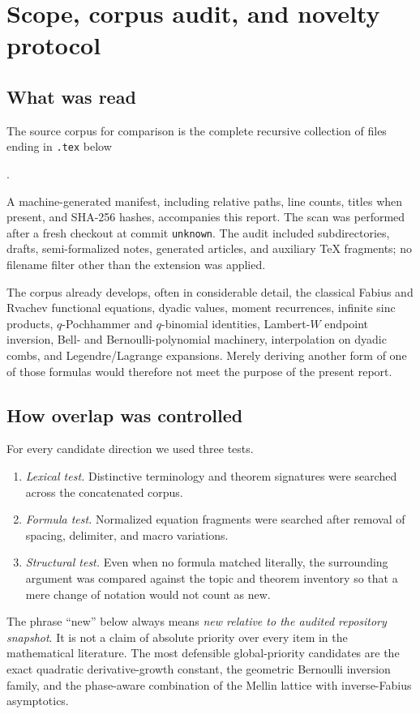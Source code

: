 \documentclass[11pt,oneside]{article}
\theoremstyle{definition}
\theoremstyle{remark}
\newcommand{\RepoCommit}{\texttt{unknown}}
\begin{document}
\tableofcontents
\clearpage

\section{Scope, corpus audit, and novelty protocol}

\subsection{What was read}

The source corpus for comparison is the complete recursive collection of files ending
in \texttt{.tex} below
\begin{center}
.
\end{center}
A machine-generated manifest, including relative paths, line counts, titles when
present, and SHA-256 hashes, accompanies this report.  The scan was performed after a
fresh checkout at commit \RepoCommit.  The audit included subdirectories, drafts,
semi-formalized notes, generated articles, and auxiliary TeX fragments; no filename
filter other than the extension was applied.

The corpus already develops, often in considerable detail, the classical Fabius and
Rvachev functional equations, dyadic values, moment recurrences, infinite sinc
products, $q$-Pochhammer and $q$-binomial identities, Lambert-$W$ endpoint inversion,
Bell- and Bernoulli-polynomial machinery, interpolation on dyadic combs, and
Legendre/Lagrange expansions.  Merely deriving another form of one of those formulas
would therefore not meet the purpose of the present report.

\subsection{How overlap was controlled}

For every candidate direction we used three tests.
\begin{enumerate}[label=(\roman*)]
\item \emph{Lexical test.}  Distinctive terminology and theorem signatures were
searched across the concatenated corpus.
\item \emph{Formula test.}  Normalized equation fragments were searched after removal
of spacing, delimiter, and macro variations.
\item \emph{Structural test.}  Even when no formula matched literally, the surrounding
argument was compared against the topic and theorem inventory so that a mere change of
notation would not count as new.
\end{enumerate}
The phrase ``new'' below always means \emph{new relative to the audited repository
snapshot}.  It is not a claim of absolute priority over every item in the mathematical
literature.  The most defensible global-priority candidates are the exact quadratic
derivative-growth constant, the geometric Bernoulli inversion family, and the
phase-aware combination of the Mellin lattice with inverse-Fabius asymptotics.
\end{document}
